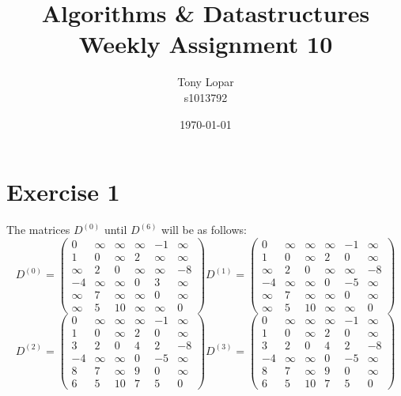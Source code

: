 \documentclass{article}
\begin{document}
\title{Algorithms \& Datastructures \\ Weekly Assignment 10}
\date{\today}
\author{Tony Lopar \\ s1013792}
\maketitle
\section*{Exercise 1}
The matrices $D^{(0)}$ until $D^{(6)}$ will be as follows:
\[
D^{(0)} =
  \begin{pmatrix}
    0 & \infty & \infty & \infty & -1 & \infty \\
    1 & 0 & \infty & 2 & \infty & \infty \\
    \infty & 2 & 0 & \infty & \infty & -8 \\
    -4 & \infty & \infty & 0 & 3 & \infty \\
    \infty & 7 & \infty & \infty & 0 & \infty \\
    \infty & 5 & 10 & \infty & \infty & 0
  \end{pmatrix}
D^{(1)} =
  \begin{pmatrix}
    0 & \infty & \infty & \infty & -1 & \infty \\
    1 & 0 & \infty & 2 & 0 & \infty \\
    \infty & 2 & 0 & \infty & \infty & -8 \\
    -4 & \infty & \infty & 0 & -5 & \infty \\
    \infty & 7 & \infty & \infty & 0 & \infty \\
    \infty & 5 & 10 & \infty & \infty & 0
  \end{pmatrix}
  \]
  \[
D^{(2)}=
  \begin{pmatrix}
    0 & \infty & \infty & \infty & -1 & \infty \\
    1 & 0 & \infty & 2 & 0 & \infty \\
    3 & 2 & 0 & 4 & 2 & -8 \\
    -4 & \infty & \infty & 0 & -5 & \infty \\
    8 & 7 & \infty & 9 & 0 & \infty \\
    6 & 5 & 10 & 7 & 5 & 0
  \end{pmatrix}
D^{(3)}=
  \begin{pmatrix}
    0 & \infty & \infty & \infty & -1 & \infty \\
    1 & 0 & \infty & 2 & 0 & \infty \\
    3 & 2 & 0 & 4 & 2 & -8 \\
    -4 & \infty & \infty & 0 & -5 & \infty \\
    8 & 7 & \infty & 9 & 0 & \infty \\
    6 & 5 & 10 & 7 & 5 & 0
  \end{pmatrix}
  \]
\end{document}
